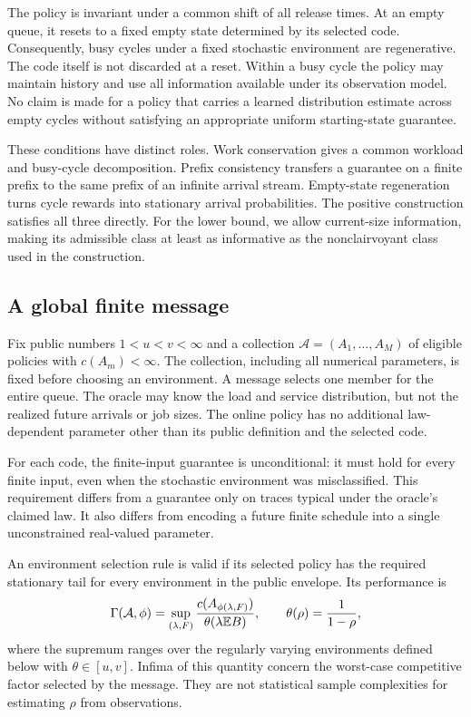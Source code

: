 The policy is invariant under a common shift of all release times. At an empty queue, it resets to a fixed empty state determined by its selected code. Consequently, busy cycles under a fixed stochastic environment are regenerative. The code itself is not discarded at a reset. Within a busy cycle the policy may maintain history and use all information available under its observation model. No claim is made for a policy that carries a learned distribution estimate across empty cycles without satisfying an appropriate uniform starting-state guarantee.

These conditions have distinct roles. Work conservation gives a common workload and busy-cycle decomposition. Prefix consistency transfers a guarantee on a finite prefix to the same prefix of an infinite arrival stream. Empty-state regeneration turns cycle rewards into stationary arrival probabilities. The positive construction satisfies all three directly. For the lower bound, we allow current-size information, making its admissible class at least as informative as the nonclairvoyant class used in the construction.

\subsection{A global finite message}
Fix public numbers $1<u<v<\infty$ and a collection $\mathcal A=(A_1,\ldots,A_M)$ of eligible policies with $c(A_m)<\infty$. The collection, including all numerical parameters, is fixed before choosing an environment. A message selects one member for the entire queue. The oracle may know the load and service distribution, but not the realized future arrivals or job sizes. The online policy has no additional law-dependent parameter other than its public definition and the selected code.

For each code, the finite-input guarantee is unconditional: it must hold for every finite input, even when the stochastic environment was misclassified. This requirement differs from a guarantee only on traces typical under the oracle's claimed law. It also differs from encoding a future finite schedule into a single unconstrained real-valued parameter.

An environment selection rule is valid if its selected policy has the required stationary tail for every environment in the public envelope. Its performance is
\begin{equation}\label{eq:inflation-def}
 \Gamma(\mathcal A,\phi)
   =\sup_{(\lambda,F)}
      \frac{c(A_{\phi(\lambda,F)})}{\theta(\lambda\mathbb E B)},
 \qquad \theta(\rho)=\frac1{1-\rho},
\end{equation}
where the supremum ranges over the regularly varying environments defined below with $\theta\in[u,v]$. Infima of this quantity concern the worst-case competitive factor selected by the message. They are not statistical sample complexities for estimating $\rho$ from observations.

